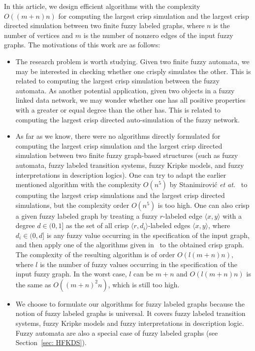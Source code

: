 \documentclass[11pt]{article}
\newcommand{\red}[1]{{#1}\xspace}
\def\tuple#1{\langle#1\rangle}
\begin{document}
In this article, we design efficient algorithms with the complexity $O((m+n)n)$ for computing the largest crisp simulation and the largest crisp directed simulation between two finite fuzzy labeled graphs, where $n$ is the number of vertices and $m$ is the number of nonzero edges of the input fuzzy graphs. 
%
The motivations of this work are as follows:
\begin{itemize}
\item The research problem is worth studying. Given two finite fuzzy automata, we may be interested in checking whether one crisply simulates the other. This is related to computing the largest crisp simulation between the fuzzy automata. As another potential application, given two objects in a fuzzy linked data network, we may wonder whether one has all positive properties with a greater or equal degree than the other has. This is related to computing the largest crisp directed auto-simulation of the fuzzy network. 

\item As far as we know, there were no algorithms directly formulated for computing the largest crisp simulation and the largest crisp directed simulation between two finite fuzzy graph-based structures (such as fuzzy automata, fuzzy labeled transition systems, fuzzy Kripke models, and fuzzy interpretations in description logics). One can try to adapt the earlier mentioned algorithm with the complexity $O(n^5)$ by Stanimirovi{\'c} {\em et at.}~\cite{StanimirovicSC2019} to computing the largest crisp simulations and the largest crisp directed simulations, but the complexity order $O(n^5)$ is too high. 
%
\red{One can also crisp a given fuzzy labeled graph by treating a fuzzy $r$-labeled edge $\tuple{x,y}$ with a degree $d \in (0,1]$ as the set of all crisp $\tuple{r,d_i}$-labeled edges $\tuple{x,y}$, where $d_i \in (0,d]$ is any fuzzy value occurring in the specification of the input graph, and then apply one of the algorithms given in~\cite{BloomP95,HenzingerHK95,CompBSDLP} to the obtained crisp graph. The complexity of the resulting algorithm is of order $O(l(m+n)n)$, where $l$ is the number of fuzzy values occurring in the specification of the input fuzzy graph. In the worst case, $l$ can be $m+n$ and $O(l(m+n)n)$ is the same as $O((m+n)^2n)$, which is still too high.}  

\item \red{We choose to formulate our algorithms for fuzzy labeled graphs because the notion of fuzzy labeled graphs is universal. It covers fuzzy labeled transition systems, fuzzy Kripke models and fuzzy interpretations in description logic. Fuzzy automata are also a special case of fuzzy labeled graphs (see Section~\ref{sec: HFKDS}).}  
\end{itemize}
\end{document}
